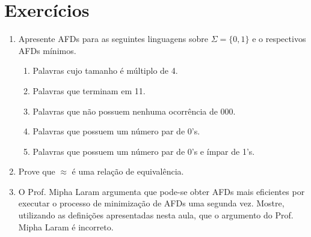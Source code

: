 \documentclass[a4paper]{article}
\theoremstyle{definition}
\begin{document}
  \section{Exercícios}

  \begin{enumerate}
    \item Apresente AFDs para as seguintes linguagens sobre $\Sigma = \{0,1\}$ e
      o respectivos AFDs mínimos.
      \begin{enumerate}
        \item Palavras cujo tamanho é múltiplo de 4.
        \item Palavras que terminam em 11.
        \item Palavras que não possuem nenhuma ocorrência de 000.
        \item Palavras que possuem um número par de 0's.
        \item Palavras que possuem um número par de 0's e ímpar de 1's.
      \end{enumerate}
    \item Prove que $\approx$ é uma relação de equivalência.
    \item O Prof. Mipha Laram argumenta que pode-se obter AFDs mais eficientes
      por executar o processo de minimização de AFDs uma segunda vez. Mostre,
      utilizando as definições apresentadas nesta aula, que o argumento do Prof.
      Mipha Laram é incorreto.
  \end{enumerate}
\end{document}
